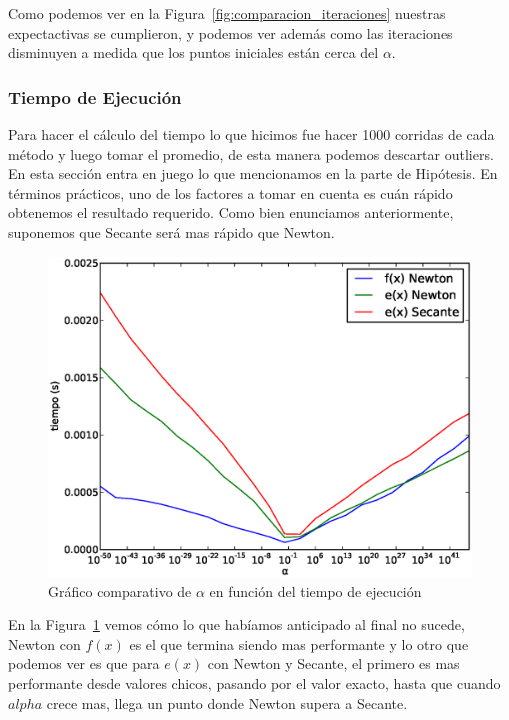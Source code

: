 Como podemos ver en la Figura~\ref{fig:comparacion_iteraciones} nuestras expectactivas se cumplieron, y podemos ver además como las iteraciones disminuyen a medida que los puntos iniciales están cerca del $\alpha$.


\subsubsection{Tiempo de Ejecución} %
\label{ssub:tiempo_de_ejecuci_n}

Para hacer el cálculo del tiempo lo que hicimos fue hacer 1000 corridas de cada método y luego tomar el promedio, de esta manera podemos descartar outliers. En esta sección entra en juego lo que mencionamos en la parte de Hipótesis. En términos prácticos, uno de los factores a tomar en cuenta es cuán rápido obtenemos el resultado requerido. Como bien enunciamos anteriormente, suponemos que Secante será mas rápido que Newton.\\

\begin{figure}[!htbp]
  \begin{center}
    \includegraphics[scale=0.5]{graficos/new/comparacion_tiempos.eps}
    \caption{\label{fig:comparacion_tiempos} Gráfico comparativo de $\alpha$ en función del tiempo de ejecución}
  \end{center}
\end{figure}

En la Figura~\ref{fig:comparacion_tiempos} vemos cómo lo que habíamos anticipado al final no sucede, Newton con $f(x)$ es el que termina siendo mas performante y lo otro que podemos ver es que para $e(x)$ con Newton y Secante, el primero es mas performante desde valores chicos, pasando por el valor exacto, hasta que cuando $alpha$ crece mas, llega un punto donde Newton supera a Secante.\\

